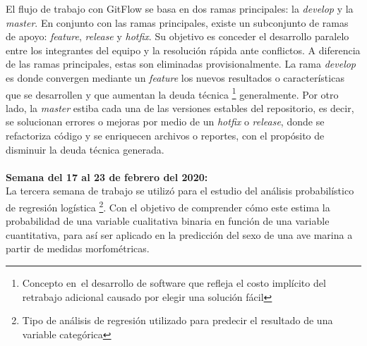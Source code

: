 \documentclass{article}
\begin{document}
     El flujo de trabajo con GitFlow se basa en dos ramas principales: la \textit{develop} y la \textit{master}. En conjunto con las ramas principales, existe un subconjunto de ramas de apoyo: \textit{feature}, \textit{release} y \textit{hotfix}. Su objetivo es conceder el desarrollo paralelo entre los integrantes del equipo y la resolución rápida ante conflictos. A diferencia de las ramas principales, estas son eliminadas provisionalmente.
    La rama \textit{develop} es donde convergen mediante un \textit{feature} los nuevos resultados o características que se desarrollen y que aumentan la deuda técnica \footnote{Concepto en el desarrollo de software que refleja el costo implícito del retrabajo adicional causado por elegir una solución fácil} generalmente. Por otro lado, la \textit{master} estiba cada una de las versiones estables del repositorio, es decir, se solucionan errores o mejoras por medio de un \textit{hotfix} o \textit{release}, donde se refactoriza código y se enriquecen archivos o reportes, con el propósito de disminuir la deuda técnica generada. 
    \\ \\ 
    \textbf{Semana del 17 al 23 de febrero del 2020:} \\
   La tercera semana de trabajo se utilizó para el estudio del análisis probabilístico de regresión logística \footnote{Tipo de análisis de regresión utilizado para predecir el resultado de una variable categórica}. Con el objetivo de comprender cómo este estima la probabilidad de una variable cualitativa binaria en función de una variable cuantitativa, para así ser aplicado en la predicción del sexo de una ave marina a partir de medidas morfométricas.
   
\end{document}
